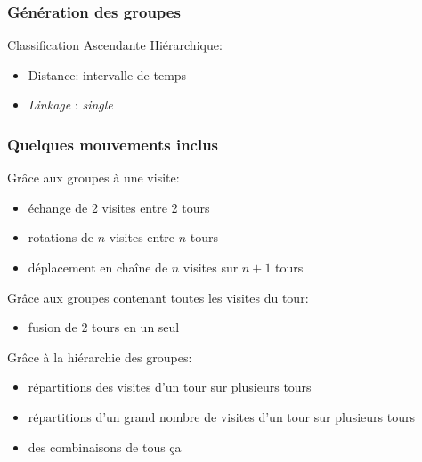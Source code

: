 \documentclass[table]{beamer}
\newcommand*{\foreign}[2][english]{%
    \emph{\foreignlanguage{#1}{#2}}%
}
\begin{document}
\begin{frame}
  \frametitle{Génération des groupes}

  Classification Ascendante Hiérarchique:
  \begin{itemize}
  \item Distance: intervalle de temps
  \item \foreign{Linkage}: \foreign{single}
  \end{itemize}

  \centering
\end{frame}

\begin{frame}
  \frametitle{Quelques mouvements inclus}

  Grâce aux groupes à une visite:

  \begin{itemize}
  \item échange de 2 visites entre 2 tours
  \item rotations de $n$ visites entre $n$ tours
  \item déplacement en chaîne de $n$ visites sur $n+1$ tours
  \end{itemize}

  Grâce aux groupes contenant toutes les visites du tour:

  \begin{itemize}
  \item fusion de 2 tours en un seul
  \end{itemize}

  Grâce à la hiérarchie des groupes:

  \begin{itemize}
  \item répartitions des visites d'un tour sur plusieurs tours
  \item répartitions d'un grand nombre de visites d'un tour sur
    plusieurs tours
  \item des combinaisons de tous ça
  \end{itemize}
\end{frame}
\end{document}
